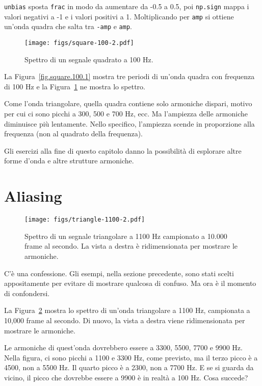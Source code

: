 \documentclass[12pt]{book} \usepackage[width=5.5in,height=8.5in, hmarginratio=3:2,vmarginratio=1:1]{geometry}
\begin{document}
{\tt unbias} sposta {\tt frac} in modo da aumentare da -0.5 a 0.5, poi {\tt np.sign} mappa i valori negativi a -1 e i valori positivi a 1. Moltiplicando per {\tt amp} si ottiene un'onda quadra che salta tra {\tt -amp} e {\tt amp}.

\begin{figure} 

\centerline{\texttt{[image: figs/square-100-2.pdf]}} \caption{Spettro di un segnale quadrato a 100 Hz.} \label{fig.square.100.2} \end{figure} 

La Figura~\ref{fig.square.100.1} mostra tre periodi di un'onda quadra con frequenza di 100 Hz e la Figura~\ref{fig.square.100.2} ne mostra lo spettro.

Come l'onda triangolare, quella quadra contiene solo armoniche dispari, motivo per cui ci sono picchi a 300, 500 e 700 Hz, ecc. Ma l'ampiezza delle armoniche diminuisce più lentamente. Nello specifico, l'ampiezza scende in proporzione alla frequenza (non al quadrato della frequenza).

Gli esercizi alla fine di questo capitolo danno la possibilità di esplorare altre forme d'onda e altre strutture armoniche.

\section{Aliasing} \label{aliasing} 

\begin{figure} 

\centerline{\texttt{[image: figs/triangle-1100-2.pdf]}} \caption{Spettro di un segnale triangolare a 1100 Hz campionato a 10.000 frame al secondo. La vista a destra è ridimensionata per mostrare le armoniche.} \label{fig.triangle.1100.2} \end{figure} 

C'è una confessione. Gli esempi, nella sezione precedente, sono stati scelti appositamente per evitare di mostrare qualcosa di confuso. Ma ora è il momento di confondersi.

La Figura~\ref{fig.triangle.1100.2} mostra lo spettro di un'onda triangolare a 1100 Hz, campionata a 10,000 frame al secondo. Di nuovo, la vista a destra viene ridimensionata per mostrare le armoniche.

Le armoniche di quest'onda dovrebbero essere a 3300, 5500, 7700 e 9900 Hz. Nella figura, ci sono picchi a 1100 e 3300 Hz, come previsto, ma il terzo picco è a 4500, non a 5500 Hz. Il quarto picco è a 2300, non a 7700 Hz. E se si guarda da vicino, il picco che dovrebbe essere a 9900 è in realtà a 100 Hz. Cosa succede?
\end{document}
